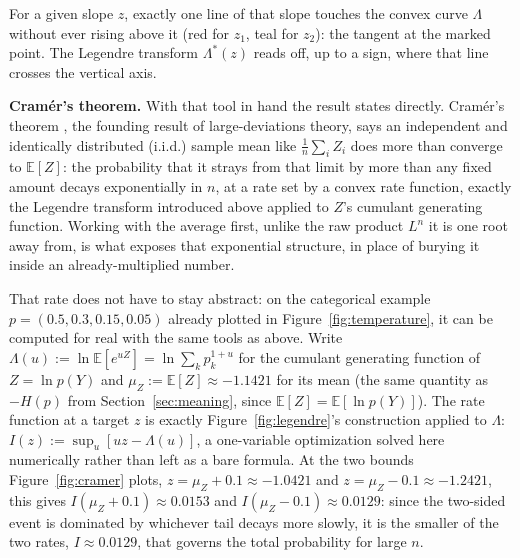 \documentclass[11pt]{article}
\begin{document}
\begin{center}
\end{center}
\begin{center}
\footnotesize
For a given slope $z$, exactly one line of that slope touches the
convex curve $\Lambda$ without ever rising above it (red for $z_1$,
teal for $z_2$): the tangent at the marked point. The Legendre
transform $\Lambda^*(z)$ reads off, up to a sign, where that line
crosses the vertical axis.
\label{fig:legendre}
\end{center}

\textbf{Cram\'er's theorem.} With that tool in hand the result states
directly. Cram\'er's theorem \citep{cramer1938}, the founding result of
large-deviations theory, says an independent and identically
distributed (i.i.d.) sample mean like
$\frac1n\sum_i Z_i$ does more than converge to $\mathbb E[Z]$: the
probability that it strays from that limit by more than any fixed
amount decays exponentially in $n$, at a rate set by a convex rate
function, exactly the Legendre transform introduced above applied to
$Z$'s cumulant generating function. Working with the average first,
unlike the raw product $L^n$ it is one root away from, is what
exposes that exponential structure, in place of burying it inside an
already-multiplied number.

That rate does not have to stay abstract: on the categorical example
$p = (0.5, 0.3, 0.15, 0.05)$ already plotted in
Figure~\ref{fig:temperature}, it can be computed for real with the
same tools as above. Write $\Lambda(u) := \ln \mathbb E[e^{uZ}] = \ln
\sum_k p_k^{1+u}$ for the cumulant generating function of $Z = \ln
p(Y)$ and $\mu_Z := \mathbb E[Z] \approx -1.1421$ for its mean (the
same quantity as $-H(p)$ from Section~\ref{sec:meaning}, since
$\mathbb E[Z] = \mathbb E[\ln p(Y)]$). The rate function at a target
$z$ is exactly Figure~\ref{fig:legendre}'s construction applied to
$\Lambda$: $I(z) := \sup_u [uz - \Lambda(u)]$, a one-variable
optimization solved here numerically rather than left as a bare
formula. At the two bounds Figure~\ref{fig:cramer} plots, $z=\mu_Z+0.1
\approx -1.0421$ and $z=\mu_Z-0.1 \approx -1.2421$, this gives
$I(\mu_Z+0.1) \approx 0.0153$ and $I(\mu_Z-0.1) \approx 0.0129$: since
the two-sided event is dominated by whichever tail decays more slowly,
it is the smaller of the two rates, $I \approx 0.0129$, that governs
the total probability for large $n$.
\end{document}
